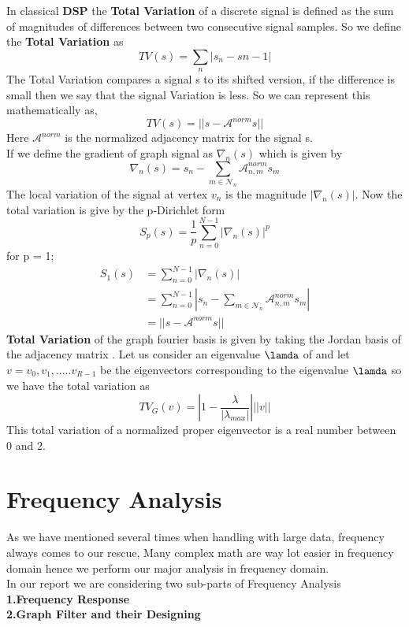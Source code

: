 \documentclass[12pt,onecolumn]{article}
\begin{document}
In classical \textbf{DSP} the \textbf{Total Variation} of a discrete signal is defined as the sum of magnitudes of differences between two consecutive signal samples. So we define the \textbf{Total Variation} as
\begin{equation*}
    TV(s) = \sum_{n} |s_{n} - s{n-1}|
\end{equation*}
The Total Variation compares a signal s to its shifted version, if the difference is small then we say that the signal Variation is less. So we can represent this mathematically as,
\begin{equation*}
    TV(s) = ||s - \mathcal{A}^{norm}s||
\end{equation*}
Here $\mathcal{A}^{norm}$ is the normalized adjacency matrix for the signal s.\\
If we define the gradient of graph signal as $\nabla_{n}(s)$ which is given by 
\begin{equation*}
    \nabla_{n}(s) = s_{n} - \sum_{m\in\mathcal{N}_{n}}\mathcal{A}_{n,m}^{norm}s_{m}  
\end{equation*}
The local variation of the signal at vertex $v_{n}$ is the magnitude $|\nabla_{n}(s)|$.
Now the total variation is give by the p-Dirichlet form 
\begin{equation*}
    S_{p}(s) = \frac{1}{p}\sum_{n=0}^{N-1}|\nabla_{n}(s)|^{p}
\end{equation*}
for p = 1;
\begin{equation*}
    \begin{split}
        S_{1}(s) &= \sum_{n=0}^{N-1}|\nabla_{n}(s)| \\
        &= \sum_{n=0}^{N-1}|s_{n} - \sum_{m\in\mathcal{N}_{n}}\mathcal{A}_{n,m}^{norm}s_{m}| \\
        &= ||s - \mathcal{A}^{norm}s||
    \end{split}
\end{equation*}
\textbf{Total Variation} of the graph fourier basis is given by taking the Jordan basis of the adjacency matrix . Let us consider an eigenvalue $\lamda$ of  and let $v = v_{0},v_{1},.....v_{R-1} $ be the eigenvectors corresponding to the eigenvalue $\lamda$  so we have the total variation as
\begin{equation*}
    TV_{G}(v) = | 1- \frac{\lambda}{|\lambda_{max}|}|||v|| 
\end{equation*}
This total variation of a normalized proper eigenvector is a real number between 0 and 2.
\newline
\section{Frequency Analysis}
As we have mentioned several times when handling with large data, frequency always comes to our rescue, Many complex math are way lot easier in frequency domain hence we perform our major analysis in frequency domain.\\
In our report we are considering two sub-parts of Frequency Analysis\\
\textbf{1.Frequency Response} \\
\textbf{2.Graph Filter and their Designing}
\end{document}
